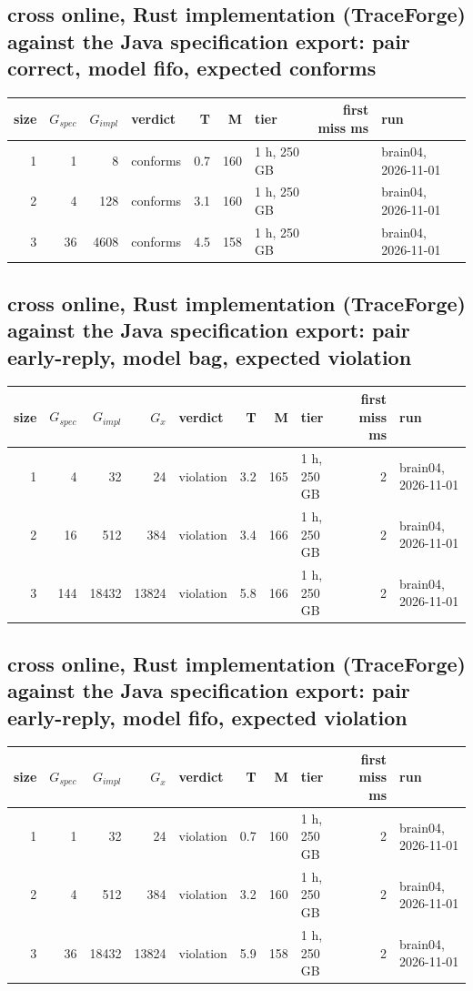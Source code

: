 \documentclass[10pt]{article}
\begin{document}
\subsection*{cross online, Rust implementation (TraceForge) against the Java specification export: pair \textsf{correct}, model fifo, expected conforms}
\begin{longtable}{@{}rrrlrrlrl@{}}
\toprule
size & $G_{\mathit{spec}}$ & $G_{\mathit{impl}}$ & verdict & T & M & tier & first miss ms & run \\
\midrule
\endhead
\color{red} 1 & 1 & 8 & conforms & 0.7 & 160 & 1 h, 250 GB &  & brain04, 2026-11-01 \\
\color{red} 2 & 4 & 128 & conforms & 3.1 & 160 & 1 h, 250 GB &  & brain04, 2026-11-01 \\
\color{red} 3 & 36 & 4608 & conforms & 4.5 & 158 & 1 h, 250 GB &  & brain04, 2026-11-01 \\
\bottomrule
\end{longtable}
\subsection*{cross online, Rust implementation (TraceForge) against the Java specification export: pair \textsf{early-reply}, model bag, expected violation}
\begin{longtable}{@{}rrrrlrrlrl@{}}
\toprule
size & $G_{\mathit{spec}}$ & $G_{\mathit{impl}}$ & $G_x$ & verdict & T & M & tier & first miss ms & run \\
\midrule
\endhead
\color{red} 1 & 4 & 32 & 24 & violation & 3.2 & 165 & 1 h, 250 GB & 2 & brain04, 2026-11-01 \\
\color{red} 2 & 16 & 512 & 384 & violation & 3.4 & 166 & 1 h, 250 GB & 2 & brain04, 2026-11-01 \\
\color{red} 3 & 144 & 18432 & 13824 & violation & 5.8 & 166 & 1 h, 250 GB & 2 & brain04, 2026-11-01 \\
\bottomrule
\end{longtable}
\subsection*{cross online, Rust implementation (TraceForge) against the Java specification export: pair \textsf{early-reply}, model fifo, expected violation}
\begin{longtable}{@{}rrrrlrrlrl@{}}
\toprule
size & $G_{\mathit{spec}}$ & $G_{\mathit{impl}}$ & $G_x$ & verdict & T & M & tier & first miss ms & run \\
\midrule
\endhead
\color{red} 1 & 1 & 32 & 24 & violation & 0.7 & 160 & 1 h, 250 GB & 2 & brain04, 2026-11-01 \\
\color{red} 2 & 4 & 512 & 384 & violation & 3.2 & 160 & 1 h, 250 GB & 2 & brain04, 2026-11-01 \\
\color{red} 3 & 36 & 18432 & 13824 & violation & 5.9 & 158 & 1 h, 250 GB & 2 & brain04, 2026-11-01 \\
\bottomrule
\end{longtable}
\end{document}
